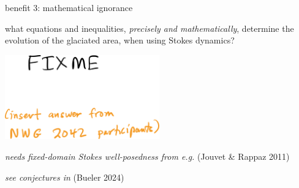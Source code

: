 \documentclass[10pt,dvipsnames]{beamer}
\begin{document}
\begin{frame}{benefit 3: mathematical ignorance}

what equations and inequalities, \emph{precisely and mathematically}, determine the evolution of the glaciated area, when using Stokes dynamics?

\bigskip

\begin{center}
\includegraphics[width=0.5\textwidth]{fixme2042}
\end{center}

\bigskip
{}

{\footnotesize \emph{needs fixed-domain Stokes well-posedness from e.g.} (Jouvet \& Rappaz 2011)}

{\footnotesize \emph{see conjectures in} (Bueler 2024)}
\end{frame}
\end{document}
